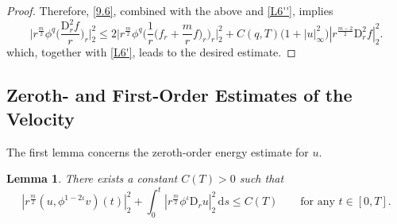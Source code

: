 \documentclass[11pt,reqno]{amsart}
\newtheorem{lem}{Lemma}[section]
\numberwithin{rk}{section}
\numberwithin{prop}{section}
\numberwithin{mydef}{section}
\numberwithin{lem}{section}
\numberwithin{equation}{section}
\numberwithin{thm}{section}
\begin{document}
\begin{proof}
Therefore, \eqref{9.6}, combined with the above and \eqref{L6''}, implies 
\begin{equation*}
\Big|r^\frac{m}{2}\phi^q\big(\frac{\mathrm{D}_r^2 f}{r}\big)_r\Big|_2^2 \leq 2\Big|r^\frac{m}{2}\phi^q \Big(\frac{1}{r}\big(f_r+ \frac{m}{r}f\big)_r\Big)_r\Big|_2^2 +C(q,T)\big(1+|u|_\infty^2\big)|r^\frac{m-2}{2}\mathrm{D}_r^2 f|_2^2.    
\end{equation*}
which, together with \eqref{L6'}, leads to the desired estimate.
\end{proof}



\subsection{Zeroth- and First-Order Estimates of the Velocity}
The first lemma concerns the zeroth-order energy estimate for $u$.
\begin{lem}\label{l4.5}
There exists a constant $C(T)>0$ such that 
\begin{equation*}
|r^{\frac{m}{2}}(u,\phi^{1-2\iota} v)(t)|_2^2 +\int_0^t |r^{\frac{m}{2}}\phi^{\iota}\mathrm{D}_r u|_2^2 \, \mathrm{d}s\leq C(T)\qquad\text{for any $t\in [0,T]$}.
\end{equation*}
\end{lem}
\end{document}
